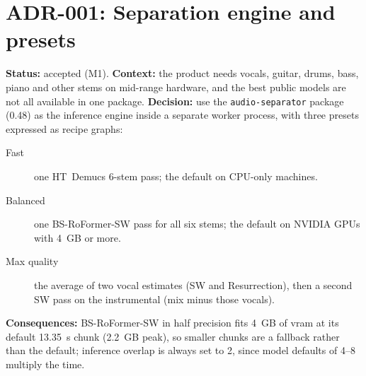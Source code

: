 \section{ADR-001: Separation engine and presets}
\textbf{Status:} accepted (M1). \textbf{Context:} the product needs vocals,
guitar, drums, bass, piano and other stems on mid-range hardware, and the best
public models are not all available in one package. \textbf{Decision:} use the
\texttt{audio-separator} package (0.48) as the inference engine inside a
separate worker process, with three presets expressed as recipe graphs:
\begin{description}
  \item[Fast] one HT~Demucs 6-stem pass; the default on CPU-only machines.
  \item[Balanced] one BS-RoFormer-SW pass for all six stems; the default on
        NVIDIA GPUs with 4~GB or more.
  \item[Max quality] the average of two vocal estimates (SW and Resurrection),
        then a second SW pass on the instrumental (mix minus those vocals).
\end{description}
\textbf{Consequences:} BS-RoFormer-SW in half precision fits 4~GB of
\gls{vram} at its default 13.35~s chunk (2.2~GB peak), so smaller chunks are a
fallback rather than the default; inference overlap is always set to 2, since
model defaults of 4--8 multiply the time.
